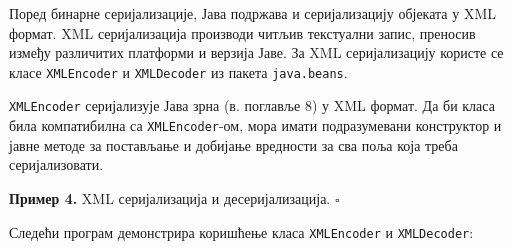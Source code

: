 Поред бинарне серијализације, Јава подржава и серијализацију објеката у XML формат. XML серијализација производи читљив текстуални запис, преносив између различитих платформи и верзија Јаве. За XML серијализацију користе се класе \texttt{XMLEncoder} и \texttt{XMLDecoder} из пакета \texttt{java.beans}.

\texttt{XMLEncoder} серијализује Јава зрна (в. поглавље 8) у XML формат. Да би класа била компатибилна са \texttt{XMLEncoder}-ом, мора имати подразумевани конструктор и јавне методе за постављање и добијање вредности за сва поља која треба серијализовати.


\bigskip

\noindent \textbf{Пример 4.} XML серијализација и десеријализација. $\square$

\medskip

Следећи програм демонстрира коришћење класа \texttt{XMLEncoder} и \texttt{XMLDecoder}:


